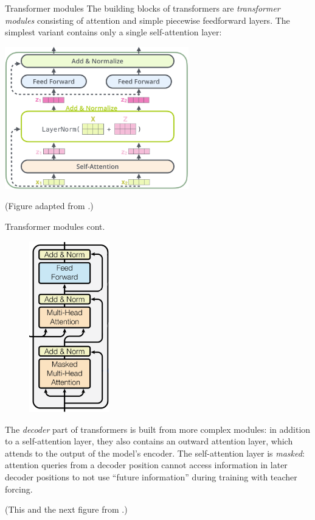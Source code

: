 \documentclass[style=upen, size=14pt]{powerdot}
\newcommand{\gold}{\color{arany}}
\theoremstyle{definition}
\begin{document}
\begin{slide}[toc=Modules]{Transformer modules}
  The building blocks of transformers are \emph{\gold transformer modules}
  consisting of attention and simple piecewise feedforward layers. The simplest
  variant contains only a single self-attention layer:
  
  \begin{centering}
    
    \includegraphics[width=0.6\textwidth]{figures/transformer_resideual_layer_norm_2.eps}

    \footnotesize{(Figure adapted from \cite{alammar2018illustrated}.)}
    
  \end{centering}
\end{slide}

\begin{slide}[toc=]{Transformer modules cont.}
  \begin{figure}
    \includegraphics[width=3.5cm]{figures/transformer_block.eps}
  \end{figure}
  The \emph{decoder} part of transformers is built from more complex modules: in
  addition to a self-attention layer, they also contains an outward attention
  layer, which attends to the output of the model's encoder. The self-attention
  layer is \emph{masked}: attention queries from a decoder position cannot
  access information in later decoder positions to not use ``future
  information'' during training with teacher forcing.\medskip

  \footnotesize{(This and the next figure from \cite{vaswani2017attention}.)}
\end{slide}
\end{document}

